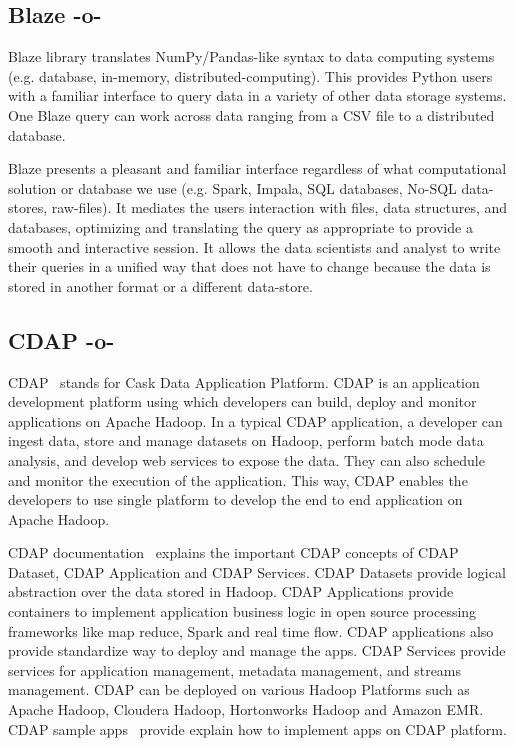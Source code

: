 \subsection{Blaze -o-}

     Blaze library translates NumPy/Pandas-like syntax to data
     computing systems (e.g. database, in-memory,
     distributed-computing). This provides Python users with a
     familiar interface to query data in a variety of other data
     storage systems.  One Blaze query can work across data ranging
     from a CSV file to a distributed database.

     Blaze presents a pleasant and familiar interface regardless of
     what computational solution or database we use (e.g. Spark,
     Impala, SQL databases, No-SQL data-stores, raw-files). It
     mediates the users interaction with files, data structures, and
     databases, optimizing and translating the query as appropriate to
     provide a smooth and interactive session. It allows the data
     scientists and analyst to write their queries in a unified way
     that does not have to change because the data is stored in
     another format or a different data-store.~\cite{www-blaze}

\subsection{CDAP -o-}

CDAP~\cite{www-cdap} stands for Cask Data Application Platform. CDAP
is an application development platform using which developers can
build, deploy and monitor applications on Apache Hadoop. In a typical
CDAP application, a developer can ingest data, store and manage
datasets on Hadoop, perform batch mode data analysis, and develop web
services to expose the data.  They can also schedule and monitor the
execution of the application. This way, CDAP enables the developers to
use single platform to develop the end to end application on Apache
Hadoop.

CDAP documentation~\cite{www-cdap-docs} explains the important CDAP
concepts of CDAP Dataset, CDAP Application and CDAP Services. CDAP
Datasets provide logical abstraction over the data stored in
Hadoop. CDAP Applications provide containers to implement application
business logic in open source processing frameworks like map reduce,
Spark and real time flow. CDAP applications also provide standardize
way to deploy and manage the apps. CDAP Services provide services for
application management, metadata management, and streams management.
CDAP can be deployed on various Hadoop Platforms such as Apache
Hadoop, Cloudera Hadoop, Hortonworks Hadoop and Amazon EMR.  CDAP
sample apps~\cite{github-cdap-sample-apps} provide explain how to
implement apps on CDAP platform.

